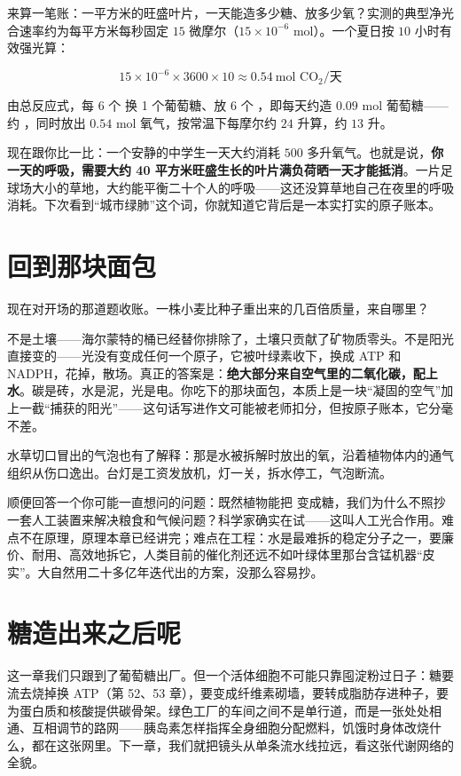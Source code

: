 \begin{qiaoliang}
来算一笔账：一平方米的旺盛叶片，一天能造多少糖、放多少氧？实测的典型净光合速率约为每平方米每秒固定 $15$ 微摩尔（$15\times 10^{-6}$ mol）。一个夏日按 $10$ 小时有效强光算：

\[
15\times 10^{-6} \times 3600 \times 10 \approx 0.54\ \text{mol CO}_2/\text{天}
\]

由总反应式，每 6 个  换 1 个葡萄糖、放 6 个 ，即每天约造 $0.09$ mol 葡萄糖——约 ，同时放出 $0.54$ mol 氧气，按常温下每摩尔约 $24$ 升算，约 $13$ 升。

现在跟你比一比：一个安静的中学生一天大约消耗 $500$ 多升氧气。也就是说，\textbf{你一天的呼吸，需要大约 40 平方米旺盛生长的叶片满负荷晒一天才能抵消}。一片足球场大小的草地，大约能平衡二十个人的呼吸——这还没算草地自己在夜里的呼吸消耗。下次看到“城市绿肺”这个词，你就知道它背后是一本实打实的原子账本。
\end{qiaoliang}

\section{回到那块面包}

现在对开场的那道题收账。一株小麦比种子重出来的几百倍质量，来自哪里？

不是土壤——海尔蒙特的桶已经替你排除了，土壤只贡献了矿物质零头。不是阳光直接变的——光没有变成任何一个原子，它被叶绿素收下，换成 ATP 和 NADPH，花掉，散场。真正的答案是：\textbf{绝大部分来自空气里的二氧化碳，配上水}。碳是砖，水是泥，光是电。你吃下的那块面包，本质上是一块“凝固的空气”加上一截“捕获的阳光”——这句话写进作文可能被老师扣分，但按原子账本，它分毫不差。

水草切口冒出的气泡也有了解释：那是水被拆解时放出的氧，沿着植物体内的通气组织从伤口逸出。台灯是工资发放机，灯一关，拆水停工，气泡断流。

顺便回答一个你可能一直想问的问题：既然植物能把  变成糖，我们为什么不照抄一套人工装置来解决粮食和气候问题？科学家确实在试——这叫人工光合作用。难点不在原理，原理本章已经讲完；难点在工程：水是最难拆的稳定分子之一，要廉价、耐用、高效地拆它，人类目前的催化剂还远不如叶绿体里那台含锰机器“皮实”。大自然用二十多亿年迭代出的方案，没那么容易抄。

\section{糖造出来之后呢}

这一章我们只跟到了葡萄糖出厂。但一个活体细胞不可能只靠囤淀粉过日子：糖要流去烧掉换 ATP（第 52、53 章），要变成纤维素砌墙，要转成脂肪存进种子，要为蛋白质和核酸提供碳骨架。绿色工厂的车间之间不是单行道，而是一张处处相通、互相调节的路网——胰岛素怎样指挥全身细胞分配燃料，饥饿时身体改烧什么，都在这张网里。下一章，我们就把镜头从单条流水线拉远，看这张代谢网络的全貌。

